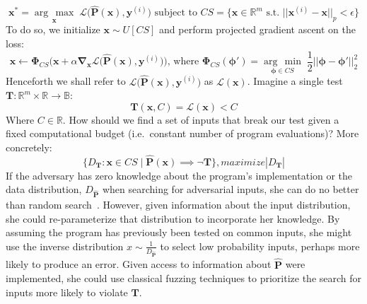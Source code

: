 \documentclass[12pt,initial,twoside,maitrise]{dms}
\newcommand{\argmax}[1]{\underset{#1}{\operatorname{arg}\,\operatorname{max}}\;}
\newcommand{\argmin}[1]{\underset{#1}{\operatorname{arg}\,\operatorname{min}}\;}
\numberwithin{equation}{section}
\numberwithin{table}{chapter}
\numberwithin{figure}{chapter}
\begin{document}
%
\begin{equation}
\mathbf{x}^* = \argmax{\mathbf{x}}\mathcal{L}\big(\mathbf{\hat P}(\mathbf{x}), \mathbf{y}^{(i)}\big) \text{ subject to } CS = \{\mathbf{x} \in \mathbb{R}^m \text{ s.t. } ||\mathbf{x}^{(i)} - \mathbf{x}||_p    < \epsilon\}
\end{equation}
%
To do so, we initialize $\mathbf{x} \sim U[CS]$ and perform projected gradient ascent on the loss:
%
\begin{equation}\label{eq:projected_gd}
    \mathbf x \leftarrow \mathbf{\Phi}_{CS}\Big(\mathbf x + \alpha\mathbf\nabla_{\mathbf x} \mathcal{L}\big(\mathbf{\hat P}(\mathbf{x}), \mathbf{y}^{(i)}\big)\Big) \text{, where }
	\mathbf{\Phi}_{CS}(\mathbf \phi') = \argmin{\mathbf \phi \in CS}\frac{1}{2}||\mathbf \phi - \mathbf \phi'||^2_2
\end{equation}
%
Henceforth we shall refer to $\mathcal{L}\big(\mathbf{\hat P}(\mathbf{x}), \mathbf{y}^{(i)}\big)$ as $\mathcal{L}(\mathbf x)$. Imagine a single test $\mathbf{T}: \mathbb{R}^m \times \mathbb{R} \rightarrow \mathbb{B}$:
%
\begin{equation} \label{eq:output_constraint_example}
    \mathbf T(\mathbf{x}, C) = \mathcal{L}(\mathbf{x}) < C
\end{equation}
%
Where $C \in \mathbb{R}$. How should we find a set of inputs that break our test given a fixed computational budget (i.e.\ constant number of program evaluations)? More concretely:
%
\begin{equation}
\{ D_\mathbf T: \mathbf x \in CS \mid \mathbf{\hat P}(\mathbf x) \implies \neg \mathbf T \}, maximize |D_\mathbf T|
\end{equation}
%
If the adversary has zero knowledge about the program's implementation or the data distribution, $D_{\mathbf{\hat P}}$ when searching for adversarial inputs, she can do no better than random search~\citep{wolpert1997no}. However, given information about the input distribution, she could re-parameterize that distribution to incorporate her knowledge. By assuming the program has previously been tested on common inputs, she might use the inverse distribution $x \sim \frac{1}{D_{\mathbf{\hat P}}}$ to select low probability inputs, perhaps more likely to produce an error. Given access to information about $\mathbf{\hat P}$ were implemented, she could use classical fuzzing techniques to prioritize the search for inputs more likely to violate $\mathbf T$.

\end{document}

